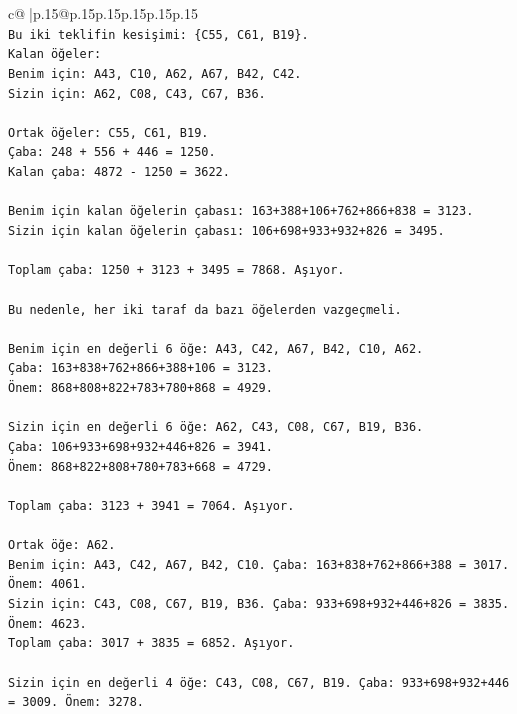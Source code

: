 \documentclass{article}
\begin{document}
{\begin{supertabular}{c@{$\;$}|p{.15\linewidth}@{}p{.15\linewidth}p{.15\linewidth}p{.15\linewidth}p{.15\linewidth}p{.15\linewidth}}
{{{\\ 
\texttt{Bu iki teklifin kesişimi: \{C55, C61, B19\}.} \\
\texttt{Kalan öğeler:} \\
\texttt{Benim için: A43, C10, A62, A67, B42, C42.} \\
\texttt{Sizin için: A62, C08, C43, C67, B36.} \\
\\ 
\texttt{Ortak öğeler: C55, C61, B19.} \\
\texttt{Çaba: 248 + 556 + 446 = 1250.} \\
\texttt{Kalan çaba: 4872 {-} 1250 = 3622.} \\
\\ 
\texttt{Benim için kalan öğelerin çabası: 163+388+106+762+866+838 = 3123.} \\
\texttt{Sizin için kalan öğelerin çabası: 106+698+933+932+826 = 3495.} \\
\\ 
\texttt{Toplam çaba: 1250 + 3123 + 3495 = 7868. Aşıyor.} \\
\\ 
\texttt{Bu nedenle, her iki taraf da bazı öğelerden vazgeçmeli.} \\
\\ 
\texttt{Benim için en değerli 6 öğe: A43, C42, A67, B42, C10, A62.} \\
\texttt{Çaba: 163+838+762+866+388+106 = 3123.} \\
\texttt{Önem: 868+808+822+783+780+868 = 4929.} \\
\\ 
\texttt{Sizin için en değerli 6 öğe: A62, C43, C08, C67, B19, B36.} \\
\texttt{Çaba: 106+933+698+932+446+826 = 3941.} \\
\texttt{Önem: 868+822+808+780+783+668 = 4729.} \\
\\ 
\texttt{Toplam çaba: 3123 + 3941 = 7064. Aşıyor.} \\
\\ 
\texttt{Ortak öğe: A62.} \\
\texttt{Benim için: A43, C42, A67, B42, C10. Çaba: 163+838+762+866+388 = 3017. Önem: 4061.} \\
\texttt{Sizin için: C43, C08, C67, B19, B36. Çaba: 933+698+932+446+826 = 3835. Önem: 4623.} \\
\texttt{Toplam çaba: 3017 + 3835 = 6852. Aşıyor.} \\
\\ 
\texttt{Sizin için en değerli 4 öğe: C43, C08, C67, B19. Çaba: 933+698+932+446 = 3009. Önem: 3278.} \\
}}}
\end{supertabular}}
\end{document}
